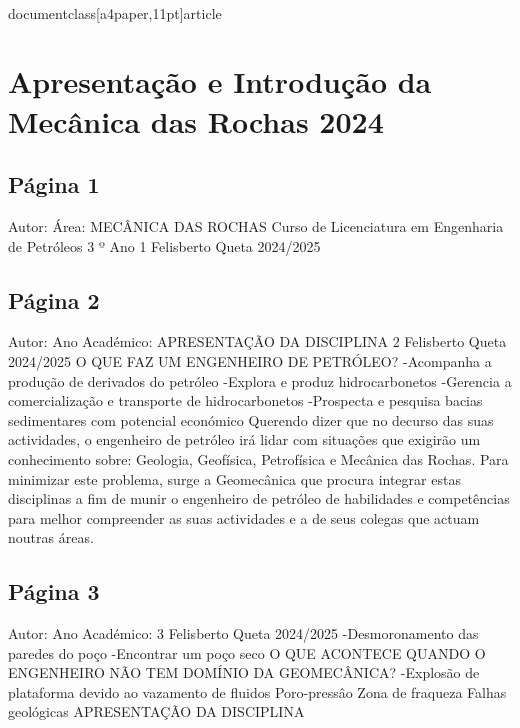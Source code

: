 \\documentclass[a4paper,11pt]{article}
\begin{document}
\clearpage
\section{Apresentação e Introdução da Mecânica das Rochas 2024}


\subsection*{Página 1}
Autor:
Área:
MECÂNICA DAS ROCHAS
Curso de Licenciatura em Engenharia de Petróleos
3 º Ano
1
Felisberto Queta
2024/2025



\subsection*{Página 2}
Autor:
Ano Académico:
APRESENTAÇÃO DA DISCIPLINA
2
Felisberto Queta
2024/2025
O QUE FAZ UM ENGENHEIRO DE PETRÓLEO? 
-Acompanha 
a produção de derivados 
do petróleo
-Explora e produz 
hidrocarbonetos
-Gerencia a  comercialização 
e transporte de 
hidrocarbonetos
-Prospecta e pesquisa 
bacias sedimentares com 
potencial económico
Querendo dizer que no decurso das suas
actividades, o engenheiro de petróleo irá lidar
com situações que exigirão um conhecimento
sobre:
Geologia, Geofísica, Petrofísica e
Mecânica das Rochas.
Para
minimizar
este
problema,
surge
a
Geomecânica
que
procura
integrar
estas
disciplinas a fim de munir o engenheiro de
petróleo de habilidades e competências para
melhor compreender as suas actividades e a
de seus colegas que actuam noutras áreas.



\subsection*{Página 3}
Autor:
Ano Académico:
3
Felisberto Queta
2024/2025
-Desmoronamento das paredes do poço
-Encontrar um poço seco
O QUE ACONTECE QUANDO O ENGENHEIRO NÃO TEM DOMÍNIO DA GEOMECÂNICA? 
-Explosão de plataforma devido ao 
vazamento de fluidos
Poro-pressâo
Zona de 
fraqueza
Falhas 
geológicas
APRESENTAÇÃO DA DISCIPLINA
\end{document}
